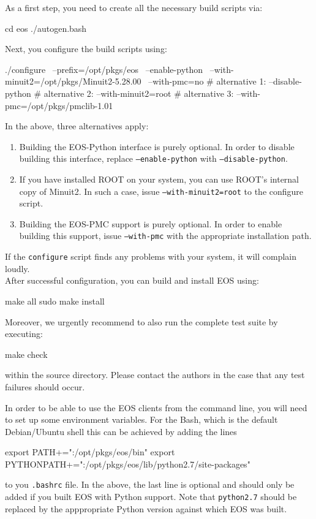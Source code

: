 As a first step, you need to create all the necessary build scripts via:
%
\begin{commandline}
cd eos
./autogen.bash
\end{commandline}
%
Next, you configure the build scripts using:
%
\begin{commandline}
./configure \
    --prefix=/opt/pkgs/eos \
    --enable-python \
    --with-minuit2=/opt/pkgs/Minuit2-5.28.00 \
    --with-pmc=no
    # alternative 1: --disable-python
    # alternative 2: --with-minuit2=root
    # alternative 3: --with-pmc=/opt/pkgs/pmclib-1.01
\end{commandline}
%
In the above, three alternatives apply:
\begin{enumerate}
    \item Building the EOS-Python interface is purely optional. In order to disable building
    this interface, replace \texttt{--enable-python} with \texttt{--disable-python}.
    \item If you have installed ROOT on your system, you can use ROOT's internal copy of Minuit2.
    In such a case, issue \texttt{--with-minuit2=root} to the configure script.
    \item Building the EOS-PMC support is purely optional. In order to enable building this
    support, issue \texttt{--with-pmc} with the appropriate installation path.
\end{enumerate}
If the \texttt{configure} script finds any problems with your system, it will complain loudly.\\

After successful configuration, you can build and install EOS using:
%
\begin{commandline}
make all
sudo make install
\end{commandline}
%
Moreover, we urgently recommend to also run the complete test suite by executing:
%
\begin{commandline}
make check
\end{commandline}
%
within the source directory. Please contact the authors in the case that any
test failures should occur.


In order to be able to use the EOS clients from the command line, you will need to
set up some environment variables. For the Bash, which is the default Debian/Ubuntu
shell this can be achieved by adding the lines
\begin{commandline}
export PATH+=":/opt/pkgs/eos/bin"
export PYTHONPATH+=":/opt/pkgs/eos/lib/python2.7/site-packages"
\end{commandline}
to you \texttt{.bashrc} file. In the above, the last line is optional and should only be
added if you built EOS with Python support. Note that \texttt{python2.7} should be
replaced by the apppropriate Python version against which EOS was built.


